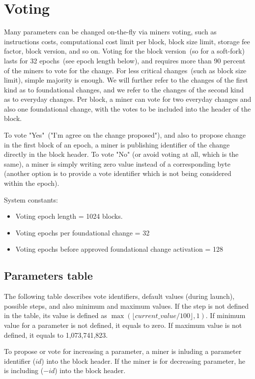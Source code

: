 \section{Voting}

Many parameters can be changed on-the-fly via miners voting, such as instructions costs, computational cost limit per block,
block size limit, storage fee factor, block version, and so on. Voting for the block version~(so for a soft-fork)
lasts for 32 epochs~(see epoch length below), and requires more than 90 percent of the miners to vote for the change.
For less critical changes~(such as block size limit), simple majority is enough. We will further refer to the changes
of the first kind as to foundational changes, and we refer to the changes of the second kind as to everyday changes.
Per block, a miner can vote for two everyday changes and also one foundational change, with the votes to be included
into the header of the block.

To vote "Yes"~("I'm agree on the change proposed"), and also to propose change in the first block of an epoch, a miner
is publishing identifier of the change directly in the block header. To vote "No" (or avoid voting at all, which is
the same), a miner is simply writing zero value instead of a corresponding byte (another option is to provide a vote
identifier which is not being considered within the epoch).

System constants:
\begin{itemize}
\item{} Voting epoch length = 1024 blocks.
\item{} Voting epochs per foundational change = 32
\item{} Voting epochs before approved foundational change activation = 128
\end{itemize}

\subsection{Parameters table}
\label{sec:params-table}

The following table describes vote identifiers, default values (during launch), possible steps, and also minimum and maximum values.
If the step is not defined in the table, its value is defined as $\max(\lfloor current\_value / 100 \rfloor, 1)$.
If minimum value for a parameter is not defined, it equals to zero. If maximum value is not defined, it equals to
1,073,741,823.

To propose or vote for increasing a parameter, a miner is inluding a parameter identifier ($id$) into the block header.
If the miner is for decreasing parameter, he is including ($-id$) into the block header.

